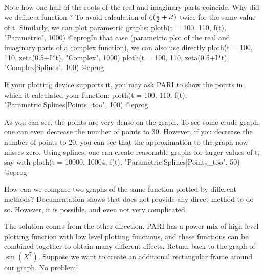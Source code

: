 Note how one half of the roots of the real and imaginary parts coincide.
Why did we define a function ?  To avoid calculation of
$\zeta({1\over2} + it)$ twice for the same value of t.  Similarly, we can
plot parametric graphs:
\bprog
  ploth(t = 100, 110, f(t), "Parametric", 1000)
@eprog\noindent In that case (parametric plot of the real and imaginary parts
of a complex function), we can also use directly
\bprog
  ploth(t = 100, 110, zeta(0.5+I*t), "Complex", 1000)
  ploth(t = 100, 110, zeta(0.5+I*t), "Complex|Splines", 100)
@eprog

If your plotting device supports it, you may ask PARI to show the points
in which it calculated your function:
\bprog
  ploth(t = 100, 110, f(t), "Parametric|Splines|Points_too", 100)
@eprog

As you can see, the points are very dense on the graph.  To see some crude
graph, one can even decrease the number of points to 30.  However, if you
decrease the number of points to 20, you can see that the approximation to
the graph now misses zero.  Using splines, one can create reasonable graphs
for larger values of t, say with
\bprog
  ploth(t = 10000, 10004, f(t), "Parametric|Splines|Points_too", 50)
@eprog

How can we compare two graphs of the same function plotted by different
methods?  Documentation shows that  does not provide any direct
method to do so.  However, it is possible, and even not very complicated.

The solution comes from the other direction.  PARI has a power mix of high
level plotting function with low level plotting functions, and these functions
can be combined together to obtain many different effects.  Return back
to the graph of $\sin(X^7)$.  Suppose we want to create an additional
rectangular frame around our graph.  No problem!

